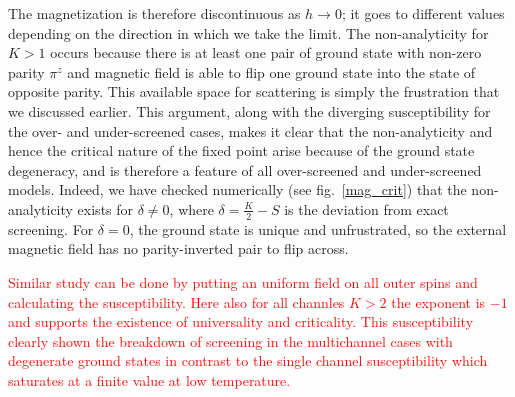 \documentclass[reprint,prb,superscriptaddress]{revtex4-2}
\begin{document}
The magnetization is therefore discontinuous as \(h\to 0\); it goes to different values depending on the direction in which we take the limit. The non-analyticity for \(K>1\) occurs because there is at least one pair of ground state with non-zero parity \(\pi^z\) and magnetic field is able to flip one ground state into the state of opposite parity. This available space for scattering is simply the frustration that we discussed earlier. This argument, along with the diverging susceptibility for the over- and under-screened cases, makes it clear that {the non-analyticity and hence the critical nature of the fixed point arise because of the ground state degeneracy, and is therefore a feature of all over-screened and under-screened  models}. Indeed, we have checked numerically (see fig.~\ref{mag_crit}) that the non-analyticity exists for \(\delta \neq 0\), where \(\delta = \frac{K}{2} - S\) is the deviation from exact screening. For \(\delta=0\), the ground state is unique and unfrustrated, so the external magnetic field has no parity-inverted pair to flip across.

\textcolor{red}{Similar study can be done by putting an uniform field on all outer spins and calculating the susceptibility. Here also for all channles $K>2$ the exponent is $-1$ and supports the existence of universality and criticality.
This susceptibility clearly shown the breakdown of screening in the multichannel cases with degenerate ground states in contrast to the single channel susceptibility which saturates at a finite value at low temperature.}
\end{document}

